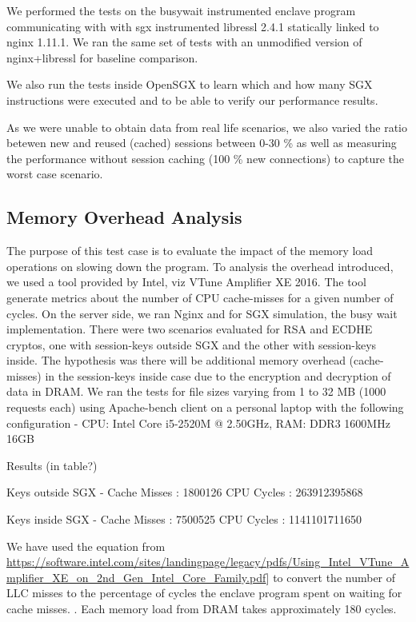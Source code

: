 \documentclass[../main.tex]{subfiles}
\begin{document}
We performed the tests on the busywait instrumented enclave program
communicating with with sgx instrumented libressl 2.4.1 statically
linked to nginx 1.11.1. We ran the same set of tests with an
unmodified version of nginx+libressl for baseline comparison.

We also run the tests inside OpenSGX to learn which and how many SGX
instructions were executed and to be able to verify our performance
results.

As we were unable to obtain data from real life scenarios, we also
varied the ratio betewen new and reused (cached) sessions between 0-30
\% as well as measuring the performance without session caching (100
\% new connections) to capture the worst case scenario.

\subsection{Memory Overhead Analysis}
The purpose of this test case is to evaluate the impact of the memory load operations on slowing down the program. To analysis the overhead introduced, we used a tool provided by Intel, viz VTune Amplifier XE 2016. The tool generate metrics about the number of CPU cache-misses for a given number of cycles. 
On the server side, we ran Nginx and for SGX simulation, the busy wait implementation. There were two scenarios evaluated for RSA and ECDHE cryptos, one with session-keys outside SGX and the other with session-keys inside. The hypothesis was  there will be additional memory overhead (cache-misses) in the session-keys inside case due to the encryption and decryption of data in DRAM. 
We ran the tests for file sizes varying from 1 to 32 MB (1000 requests each) using Apache-bench client on a personal laptop with the following configuration -
CPU: Intel Core i5-2520M @ 2.50GHz, RAM: DDR3 1600MHz 16GB

Results (in table?)

Keys outside SGX - 
Cache Misses : 1800126
CPU Cycles :  263912395868

Keys inside SGX - 
Cache Misses : 7500525
CPU Cycles :  1141101711650

We have used the equation from \url{https://software.intel.com/sites/landingpage/legacy/pdfs/Using_Intel_VTune_Amplifier_XE_on_2nd_Gen_Intel_Core_Family.pdf}] to convert the number of LLC misses to the percentage of cycles the enclave program spent on waiting for cache misses. . Each memory load from DRAM takes approximately 180 cycles.
\end{document}
